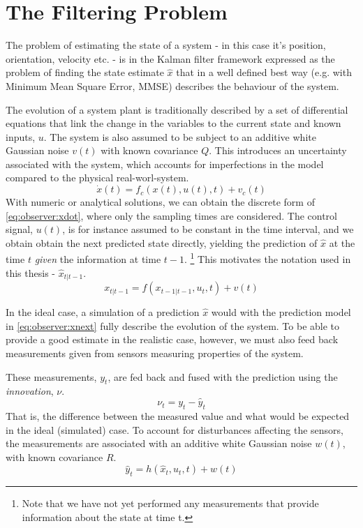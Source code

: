 \section{The Filtering Problem}
\label{sec:observer:filtering}
    The problem of estimating the state of a system - in this case
    it's position, orientation, velocity etc. - is in the Kalman filter
    framework expressed as the problem of finding the state estimate
    $\hat{x}$ that in a well defined best way (e.g. with Minimum Mean Square Error, MMSE)
    describes the behaviour of the system.

    The evolution of a system plant is traditionally described by a set of differential equations
    that link the change in the variables to the current state and known inputs, $u$.
    The system is also assumed to be subject to an additive white Gaussian noise $v(t)$ with
    known covariance $Q$.
    This introduces an uncertainty associated with the system, which accounts
    for imperfections in the model compared to the physical real-worl-system.
    \begin{equation}
        \label{eq:observer:xdot}
        \dot{x}(t) = f_{c}(x(t),u(t),t) + v_{c}(t)
    \end{equation}
    With numeric or analytical solutions, we can obtain the discrete form of
    \eqref{eq:observer:xdot}, where only the sampling times are considered.
    The control signal, $u(t)$, is for instance assumed to be constant in the time interval,
    and we obtain obtain the next predicted state directly, yielding the prediction of $\hat{x}$
    at the time $t$ \textit{given} the information at time $t-1$.
    \footnote{Note that we have not yet performed any measurements that provide information about the state at time t.}
    This motivates the notation used in this thesis - $\hat{x}_{t|t-1}$.
    \begin{equation}
        \label{eq:observer:xnext}
        x_{t|t-1} = f(x_{t-1|t-1},u_{t},t) + v(t)
    \end{equation}

    In the ideal case, a simulation of a prediction $\hat{x}$ would
    with the prediction model in \eqref{eq:observer:xnext} fully describe
    the evolution of the system.
    To be able to provide a good estimate in the realistic case, however,
    we must also feed back measurements given from sensors measuring
    properties of the system.

    These measurements, $y_{t}$, are fed back and fused with the
    prediction using the \textit{innovation}, $\nu$.
    \begin{equation}
        \nu_{t} = y_{t} - \hat{y}_{t}
    \end{equation}
    That is, the difference between the measured value and what would be
    expected in the ideal (simulated) case.
    To account for disturbances affecting the sensors, the measurements
    are associated with an additive white Gaussian noise $w(t)$, with
    known covariance $R$.
    \begin{equation}
        \hat{y}_{t} = h(\hat{x}_{t}, u_{t}, t) + w(t)
    \end{equation}

